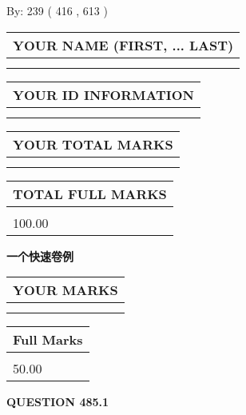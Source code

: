 \documentclass{ctexart}
\begin{document}
   
\hspace{1.0in} By: 
 239 ( 416 ,  613 )
   
   
   
   
\newpage 
\setcounter{page}{ 
   485001 } 
   
   
   
   
\noindent\begin{tabular}{|l|}
\hline
YOUR NAME (FIRST, ... LAST)  \\
\hline
 \\ 
 \\ 
\hline
\end{tabular}
\hspace{0.05in} \begin{tabular}{|l|}
\hline
 YOUR   ID   INFORMATION  \\
\hline
 \\ 
 \\ 
\hline
\end{tabular}
   
   
\vspace{0.2in}\noindent\begin{tabular}{|l|}
\hline
YOUR TOTAL MARKS  \\
\hline
 \\ 
 \\ 
\hline
\end{tabular}
\hspace{0.05in} \begin{tabular}{|l|}
\hline
TOTAL FULL MARKS  \\
\hline
 \\ 
100.00 \\
\hline
\end{tabular}
   
   
 \vspace{0.2in}
{\LARGE {\textbf{ 一个快速卷例}}}
   
   
  
\vspace{0.2in}
  
\noindent\begin{tabular}{|l|}
\hline
 YOUR MARKS  \\
\hline
 \\ 
 \\ 
\hline
\end{tabular}
\hspace{0.05in} \begin{tabular}{|l|}
\hline
 Full Marks  \\
\hline
 \\ 
50.00 \\
\hline
\end{tabular}
{\textbf{\Large{QUESTION
485.1 
}}}
  
\end{document}
